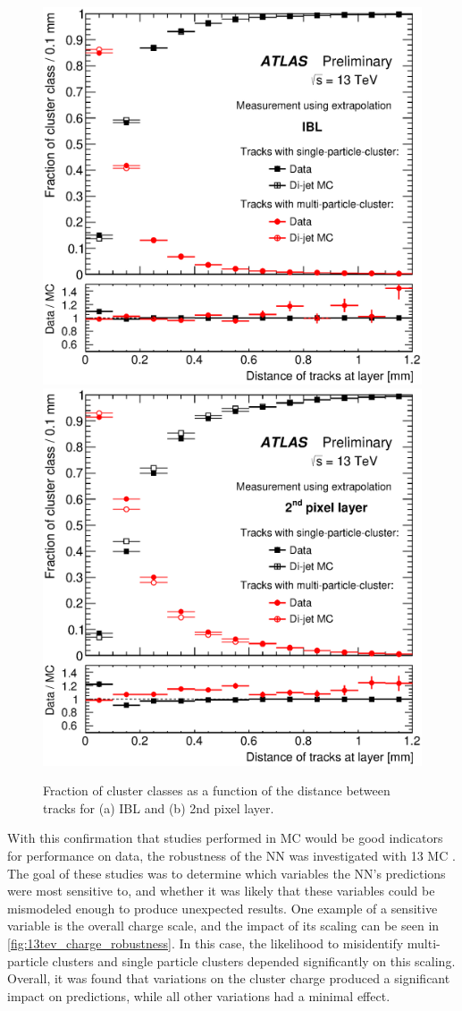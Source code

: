 \begin{centering}
\begin{figure}[bth]
\myfloatalign
\includegraphics[width=.45\linewidth]{figures/nn/fig_07a.eps}
\includegraphics[width=.45\linewidth]{figures/nn/fig_07b.eps}
\caption{Fraction of cluster classes as a function of the distance between tracks for (a) IBL and (b) 2nd pixel layer.}
\label{fig:13tev_fractions}
\end{figure}
\end{centering}

With this confirmation that studies performed in \ac{MC} would be good indicators for performance on data, the robustness of the \ac{NN} was investigated with 13 \tev \ac{MC} \cite{ATL-PHYS-PUB-2015-052}. The goal of these studies was to determine which variables the \ac{NN}'s predictions were most sensitive to, and whether it was likely that these variables could be mismodeled enough to produce unexpected results. One example of a sensitive variable is the overall charge scale, and the impact of its scaling can be seen in \autoref{fig:13tev_charge_robustness}. In this case, the likelihood to misidentify multi-particle clusters and single particle clusters depended significantly on this scaling. Overall, it was found that variations on the cluster charge produced a significant impact on predictions, while all other variations had a minimal effect. 

